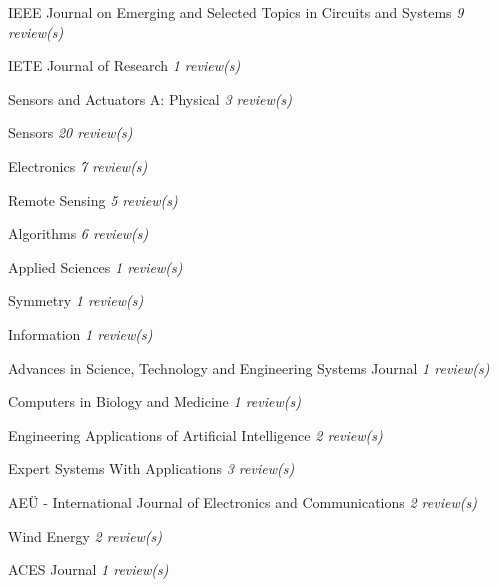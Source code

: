 {\begin{cvitems}
        \item {IEEE Journal on Emerging and Selected Topics in Circuits and Systems \hfill \bodyfontlight\slshape\color{awesome} 9 review(s)}
        \item {IETE Journal of Research \hfill \bodyfontlight\slshape\color{awesome} 1 review(s)}
        \item {Sensors and Actuators A: Physical \hfill \bodyfontlight\slshape\color{awesome} 3 review(s)}
        \item {Sensors \hfill \bodyfontlight\slshape\color{awesome} 20 review(s)}
        \item {Electronics \hfill \bodyfontlight\slshape\color{awesome} 7 review(s)}
        \item {Remote Sensing \hfill \bodyfontlight\slshape\color{awesome} 5 review(s)}
        \item {Algorithms \hfill \bodyfontlight\slshape\color{awesome} 6 review(s)}
        \item {Applied Sciences \hfill \bodyfontlight\slshape\color{awesome} 1 review(s)}
        \item {Symmetry \hfill \bodyfontlight\slshape\color{awesome} 1 review(s)}
        \item {Information \hfill \bodyfontlight\slshape\color{awesome} 1 review(s)}
        \item {Advances in Science, Technology and Engineering Systems Journal \hfill \bodyfontlight\slshape\color{awesome} 1 review(s)}
        \item {Computers in Biology and Medicine \hfill \bodyfontlight\slshape\color{awesome} 1 review(s)}
        \item {Engineering Applications of Artificial Intelligence \hfill \bodyfontlight\slshape\color{awesome} 2 review(s)}
        \item {Expert Systems With Applications \hfill \bodyfontlight\slshape\color{awesome} 3 review(s)}
        \item {AEÜ - International Journal of Electronics and Communications \hfill \bodyfontlight\slshape\color{awesome} 2 review(s)}
        \item {Wind Energy \hfill \bodyfontlight\slshape\color{awesome} 2 review(s)}
        \item {ACES Journal \hfill \bodyfontlight\slshape\color{awesome} 1 review(s)}
        
        \vspace{4.0mm}
    \end{cvitems}
}

